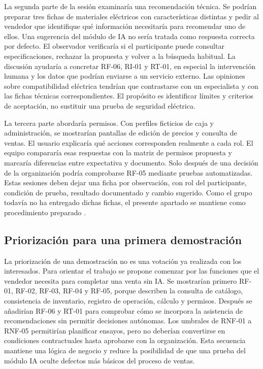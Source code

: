 La segunda parte de la sesión examinaría una recomendación técnica. Se podrían preparar tres fichas de materiales eléctricos con características distintas y pedir al vendedor que identifique qué información necesitaría para recomendar uno de ellos. Una sugerencia del módulo de IA no sería tratada como respuesta correcta por defecto. El observador verificaría si el participante puede consultar especificaciones, rechazar la propuesta y volver a la búsqueda habitual. La discusión ayudaría a concretar RF-06, RI-01 y RT-01, en especial la intervención humana y los datos que podrían enviarse a un servicio externo. Las opiniones sobre compatibilidad eléctrica tendrían que contrastarse con un especialista y con las fichas técnicas correspondientes. El propósito es identificar límites y criterios de aceptación, no sustituir una prueba de seguridad eléctrica.

La tercera parte abordaría permisos. Con perfiles ficticios de caja y administración, se mostrarían pantallas de edición de precios y consulta de ventas. El usuario explicaría qué acciones corresponden realmente a cada rol. El equipo compararía esas respuestas con la matriz de permisos propuesta y marcaría diferencias entre expectativa y documento. Solo después de una decisión de la organización podría comprobarse RF-05 mediante pruebas automatizadas. Estas sesiones deben dejar una ficha por observación, con rol del participante, condición de prueba, resultado documentado y cambio sugerido. Como el grupo todavía no ha entregado dichas fichas, el presente apartado se mantiene como procedimiento preparado \cite{iso29148,ferrari2022}.

\subsection{Priorización para una primera demostración}
La priorización de una demostración no es una votación ya realizada con los interesados. Para orientar el trabajo se propone comenzar por las funciones que el vendedor necesita para completar una venta sin IA. Se mostrarían primero RF-01, RF-02, RF-03, RF-04 y RF-05, porque describen la consulta de catálogo, consistencia de inventario, registro de operación, cálculo y permisos. Después se añadirían RF-06 y RT-01 para comprobar cómo se incorpora la asistencia de recomendaciones sin permitir decisiones autónomas. Los umbrales de RNF-01 a RNF-05 permitirían planificar ensayos, pero no deberían convertirse en condiciones contractuales hasta aprobarse con la organización. Esta secuencia mantiene una lógica de negocio y reduce la posibilidad de que una prueba del módulo IA oculte defectos más básicos del proceso de ventas.

